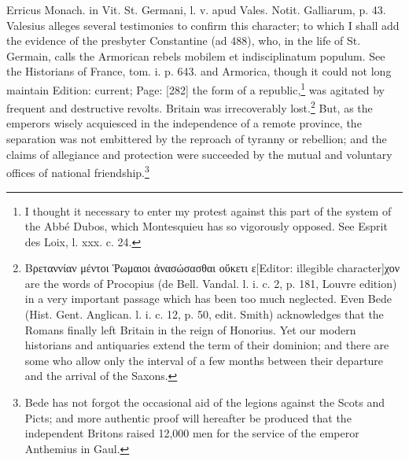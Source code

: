 {Erricus Monach. in Vit. St. Germani, l. v. apud Vales. Notit. Galliarum, p. 43. Valesius alleges several testimonies to confirm this character; to which I shall add the evidence of the presbyter Constantine (ad 488), who, in the life of St. Germain, calls the Armorican rebels mobilem et indisciplinatum populum. See the Historians of France, tom. i. p. 643.} and Armorica, though it could not long maintain Edition: current; Page: [282] the form of a republic,\footnote{I thought it necessary to enter my protest against this part of the system of the Abbé Dubos, which Montesquieu has so vigorously opposed. See Esprit des Loix, l. xxx. c. 24.} was agitated by frequent and destructive revolts. Britain was irrecoverably lost.\footnote{\textgreek{Βρεταννίαν μέντοι \texthebrew{Ῥ}ωμαιοι \texthebrew{ἀ}νασώσασθαι ο\texthebrew{ὔ}κετι ε}[Editor: illegible character]\textgreek{χον} are the words of Procopius (de Bell. Vandal. l. i. c. 2, p. 181, Louvre edition) in a very important passage which has been too much neglected. Even Bede (Hist. Gent. Anglican. l. i. c. 12, p. 50, edit. Smith) acknowledges that the Romans finally left Britain in the reign of Honorius. Yet our modern historians and antiquaries extend the term of their dominion; and there are some who allow only the interval of a few months between their departure and the arrival of the Saxons.} But, as the emperors wisely acquiesced in the independence of a remote province, the separation was not embittered by the reproach of tyranny or rebellion; and the claims of allegiance and protection were succeeded by the mutual and voluntary offices of national friendship.\footnote{Bede has not forgot the occasional aid of the legions against the Scots and Picts; and more authentic proof will hereafter be produced that the independent Britons raised 12,000 men for the service of the emperor Anthemius in Gaul.}


